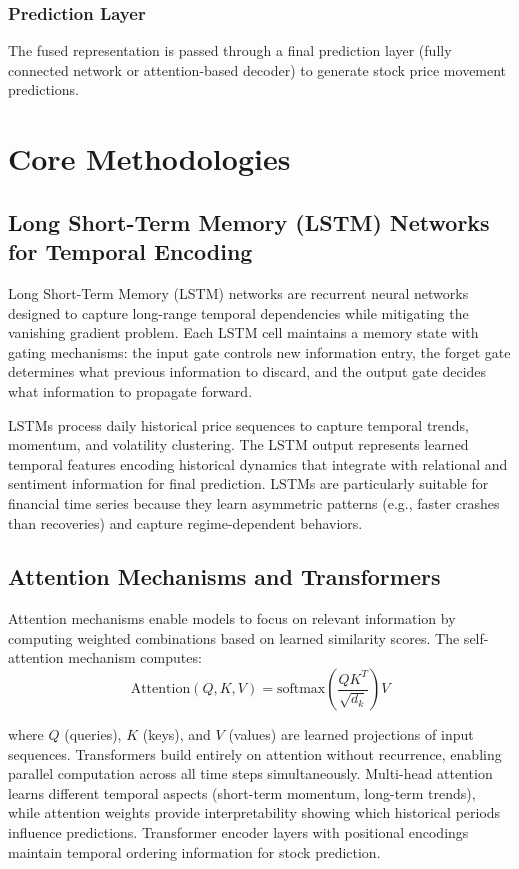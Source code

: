 \subsubsection{Prediction Layer}
The fused representation is passed through a final prediction layer (fully connected network or attention-based decoder) to generate stock price movement predictions.

\section{Core Methodologies}

\subsection{Long Short-Term Memory (LSTM) Networks for Temporal Encoding}

Long Short-Term Memory (LSTM) networks are recurrent neural networks designed to capture long-range temporal dependencies while mitigating the vanishing gradient problem. Each LSTM cell maintains a memory state with gating mechanisms: the input gate controls new information entry, the forget gate determines what previous information to discard, and the output gate decides what information to propagate forward.

LSTMs process daily historical price sequences to capture temporal trends, momentum, and volatility clustering. The LSTM output represents learned temporal features encoding historical dynamics that integrate with relational and sentiment information for final prediction. LSTMs are particularly suitable for financial time series because they learn asymmetric patterns (e.g., faster crashes than recoveries) and capture regime-dependent behaviors.

\subsection{Attention Mechanisms and Transformers}

Attention mechanisms enable models to focus on relevant information by computing weighted combinations based on learned similarity scores. The self-attention mechanism computes:
$$\text{Attention}(Q, K, V) = \text{softmax}\left(\frac{QK^T}{\sqrt{d_k}}\right)V$$

where $Q$ (queries), $K$ (keys), and $V$ (values) are learned projections of input sequences. Transformers build entirely on attention without recurrence, enabling parallel computation across all time steps simultaneously. Multi-head attention learns different temporal aspects (short-term momentum, long-term trends), while attention weights provide interpretability showing which historical periods influence predictions. Transformer encoder layers with positional encodings maintain temporal ordering information for stock prediction.

